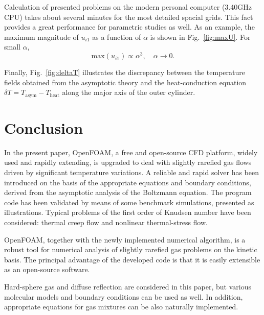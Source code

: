 \documentclass[smallextended, referee]{svjour3} %
\begin{document}
Calculation of presented problems on the modern personal computer (3.40GHz CPU)
takes about several minutes for the most detailed spacial grids.
This fact provides a great performance for parametric studies as well. As an example,
the maximum magnitude of \(u_{i1}\) as a function of \(\alpha\) is shown in Fig.~\ref{fig:maxU}.
For small \(\alpha\),
\begin{equation}
	\mathrm{max}(u_{i1}) \propto \alpha^3, \quad \alpha\to0.
\end{equation}

Finally, Fig.~\ref{fig:deltaT} illustrates the discrepancy between the temperature fields
obtained from the asymptotic theory and the heat-conduction equation
\( \delta T = T_\mathrm{asym} - T_\mathrm{heat} \)
along the major axis of the outer cylinder.

\section{Conclusion}

In the present paper, OpenFOAM\textregistered{}, a free and open-source CFD platform,
widely used and rapidly extending, is upgraded to deal with
slightly rarefied gas flows driven by significant temperature variations.
A reliable and rapid solver has been introduced on the basis of the appropriate
equations and boundary conditions, derived from the asymptotic analysis of the Boltzmann equation.
The program code has been validated by means of some benchmark simulations,
presented as illustrations. Typical problems of the first order of Knudsen number
have been considered: thermal creep flow and nonlinear thermal-stress flow.

OpenFOAM\textregistered{}, together with the newly implemented numerical algorithm,
is a robust tool for numerical analysis of slightly rarefied gas problems
on the kinetic basis. The principal advantage of the developed code is that
it is easily extensible as an open-source software.

Hard-sphere gas and diffuse reflection are considered in this paper,
but various molecular models and boundary conditions can be used as well.
In addition, appropriate equations for gas mixtures can be also naturally implemented.


\end{document}
